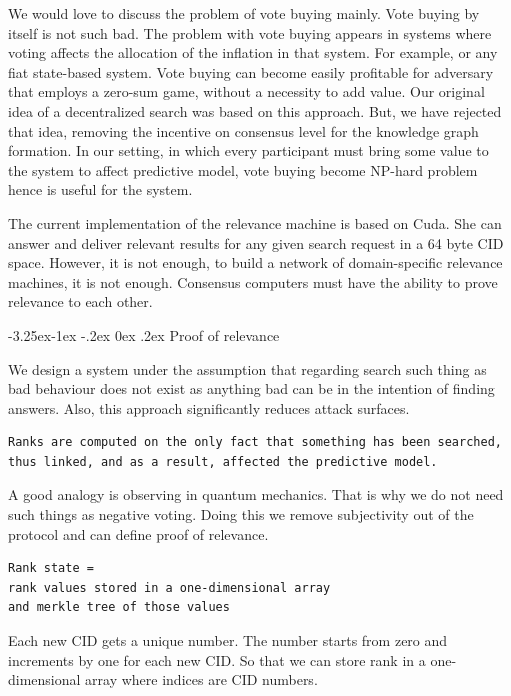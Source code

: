 \documentclass[8pt,oneside]{amsart}
\makeatletter
\newcommand{\linkgreen}[2]{\href{#1}{\color{green}{#2}}}
\renewcommand\subsection{\@startsection{subsection}{2}{\z@}%
                                     {-3.25ex\@plus -1ex \@minus -.2ex}%
                                     {0ex \@plus .2ex}%
                                     {\play\Large}}%
\newcommand{\titleSection}[1]{\subsection{#1}}
\makeatother
\begin{document}
We would love to discuss the problem of vote buying mainly. Vote buying by itself is not such bad. The problem with vote buying appears in systems where voting affects the allocation of the inflation in that system. For example, \linkgreen{http://ipfs.io/ipfs/QmepU77tqMAHHuiSASUvUnu8f8ENuPF2Kfs97WjLn8vAS3}{Steem}
or any fiat state-based system. Vote buying can become easily profitable for adversary that employs a zero-sum game, without a necessity to add value. Our original idea of a decentralized search was based on this approach. But, we have rejected that idea, removing the incentive on consensus level for the knowledge graph formation. In our setting, in which every participant must bring some value to the system to affect predictive model, vote buying become NP-hard problem hence is useful for the system.

The current implementation of the relevance machine is based on Cuda. She can answer and deliver relevant results for any given search request in a 64 byte CID space. However, it is not enough, to build a network of domain-specific relevance machines, it is not enough. Consensus computers must have the ability to prove relevance to each other.

\titleSection{Proof of relevance}\label{Proof of relevance}

We design a system under the assumption that regarding search such thing as bad behaviour does not exist as anything bad can be in the intention of finding answers. Also, this approach significantly reduces attack surfaces.

\begin{lstlisting}
Ranks are computed on the only fact that something has been searched,
thus linked, and as a result, affected the predictive model.
\end{lstlisting}

A good analogy is observing in quantum mechanics. That is why we do not need such things as negative voting. Doing this we remove subjectivity out of the protocol and can define proof of relevance.

\begin{lstlisting}
Rank state =
rank values stored in a one-dimensional array
and merkle tree of those values
\end{lstlisting}

Each new CID gets a unique number. The number starts from zero and increments by one for each new CID. So that we can store rank in a one-dimensional array where indices are CID numbers.
\end{document}
